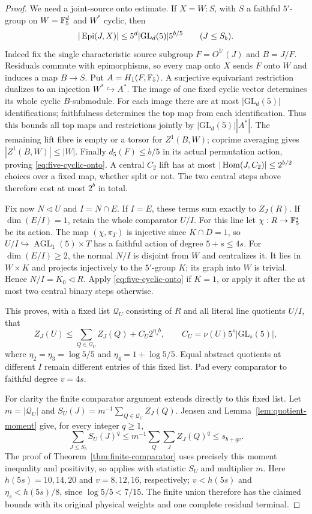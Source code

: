\begin{proof}
We need a joint-source onto estimate. If $X=W:S$, with $S$ a
faithful $5'$-group on $W=\mathbb F_5^d$ and $W^*$ cyclic, then
\begin{equation}\label{eq:five-cyclic-onto}
 |\operatorname{Epi}(J,X)|\leq5^d|\mathrm{GL}_d(5)|5^{b/5}
                 \qquad(J\leq S_b).
\end{equation}
Indeed fix the single characteristic source subgroup
$F=O^{5'}(J)$ and $B=J/F$. Residuals commute with epimorphisms,
so every map onto $X$ sends $F$ onto $W$ and induces a map
$B\to S$. Put $A=H_1(F,\mathbb F_5)$. A surjective equivariant
restriction dualizes to an injection $W^*\hookrightarrow A^*$.
The image of one fixed cyclic vector determines its whole cyclic
$B$-submodule. For each image there are at most
$|\mathrm{GL}_d(5)|$ identifications; faithfulness determines the
top map from each identification. Thus this bounds all top maps
and restrictions jointly by $|\mathrm{GL}_d(5)||A^*|$.
The remaining lift fibre is empty or a torsor for $Z^1(B,W)$;
coprime averaging gives $|Z^1(B,W)|\leq|W|$. Finally
$d_5(F)\leq b/5$ in its actual permutation action, proving
\eqref{eq:five-cyclic-onto}.
A central $C_2$ lift has at most $|\operatorname{Hom}(J,C_2)|\leq2^{b/2}$
choices over a fixed map, whether split or not. The two central
steps above therefore cost at most $2^b$ in total.

Fix now $N\lhd U$ and $I=N\cap E$. If $I=E$, these terms sum
exactly to $Z_J(R)$. If $\dim(E/I)=1$, retain the whole comparator
$U/I$. For this line let $\chi:R\to\mathbb F_5^*$ be its action.
The map $(\chi,\pi_T)$ is injective since $K\cap D=1$, so
$U/I\hookrightarrow\operatorname{AGL}_1(5)\times T$ has a
faithful action of degree $5+s\leq4s$.
For $\dim(E/I)\geq2$, the normal $N/I$ is disjoint from $W$
and centralizes it. It lies in $W\times K$ and projects injectively
to the $5'$-group $K$; its graph into $W$ is trivial. Hence
$N/I=K_0\lhd R$. Apply \eqref{eq:five-cyclic-onto} if $K=1$,
or apply it after the at most two central binary steps otherwise.

This proves, with a fixed list $\mathcal Q_U$ consisting of $R$
and all literal line quotients $U/I$, that
\[
 Z_J(U)\leq\sum_{Q\in\mathcal Q_U}Z_J(Q)+C_U2^{\eta_sb},
 \qquad C_U=\nu(U)5^s|\mathrm{GL}_s(5)|,
\]
where $\eta_2=\eta_3=\log5/5$ and
$\eta_4=1+\log5/5$. Equal abstract quotients at different $I$
remain different entries of this fixed list. Pad every comparator
to faithful degree $v=4s$.

For clarity the finite comparator argument extends directly to
this fixed list. Let $m=|\mathcal Q_U|$ and
$S_U(J)=m^{-1}\sum_{Q\in\mathcal Q_U}Z_J(Q)$. Jensen and
Lemma~\ref{lem:quotient-moment} give, for every integer $q\geq1$,
\[
 \sum_{J\leq S_b}S_U(J)^q
 \leq m^{-1}\sum_Q\sum_J Z_J(Q)^q\leq s_{b+qv}.
\]
The proof of Theorem~\ref{thm:finite-comparator} uses precisely
this moment inequality and positivity, so applies with statistic
$S_U$ and multiplier $m$. Here $h(5s)=10,14,20$ and
$v=8,12,16$, respectively; $v<h(5s)$ and
$\eta_s<h(5s)/8$, since $\log5/5<7/15$.
The finite union therefore has the claimed bounds with its original
physical weights and one complete residual terminal.
\end{proof}
